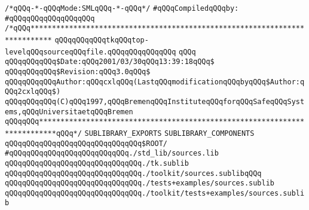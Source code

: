 \label{src/lib/tk/src/sources.sublib}
\verb|/*qQQq-*-qQQqMode:SMLqQQq-*-qQQq*/|\newline
\newline
\verb|#qQQqCompiledqQQqby:|\newline
\verb|#qQQqqQQqqQQqqQQqqQQq|\newline
\newline
\verb|/*qQQq***************************************************************************|\newline
\newline
\verb|qQQqqQQqqQQqtkqQQqtop-levelqQQqsourceqQQqfile.qQQqqQQqqQQqqQQq|\newline
\verb|qQQq|\newline
\verb|qQQqqQQqqQQq$Date:qQQq2001/03/30qQQq13:39:18qQQq$|\newline
\verb|qQQqqQQqqQQq$Revision:qQQq3.0qQQq$|\newline
\verb|qQQqqQQqqQQqAuthor:qQQqcxlqQQq(LastqQQqmodificationqQQqbyqQQq$Author:qQQq2cxlqQQq$)|\newline
\newline
\verb|qQQqqQQqqQQq(C)qQQq1997,qQQqBremenqQQqInstituteqQQqforqQQqSafeqQQqSystems,qQQqUniversitaetqQQqBremen|\newline
\newline
\verb|qQQqqQQq**************************************************************************qQQq*/|\newline
\newline
\verb|SUBLIBRARY_EXPORTS|\newline
\newline
\verb|SUBLIBRARY_COMPONENTS|\newline
\newline
\verb|qQQqqQQqqQQqqQQqqQQqqQQqqQQqqQQq$ROOT/|\newline
\newline
\verb|#qQQqqQQqqQQqqQQqqQQqqQQqqQQq./std_lib/sources.lib|\newline
\verb|qQQqqQQqqQQqqQQqqQQqqQQqqQQqqQQq./tk.sublib|\newline
\verb|qQQqqQQqqQQqqQQqqQQqqQQqqQQqqQQq./toolkit/sources.sublibqQQq|\newline
\verb|qQQqqQQqqQQqqQQqqQQqqQQqqQQqqQQq./tests+examples/sources.sublib|\newline
\verb|qQQqqQQqqQQqqQQqqQQqqQQqqQQqqQQq./toolkit/tests+examples/sources.sublib|\newline

